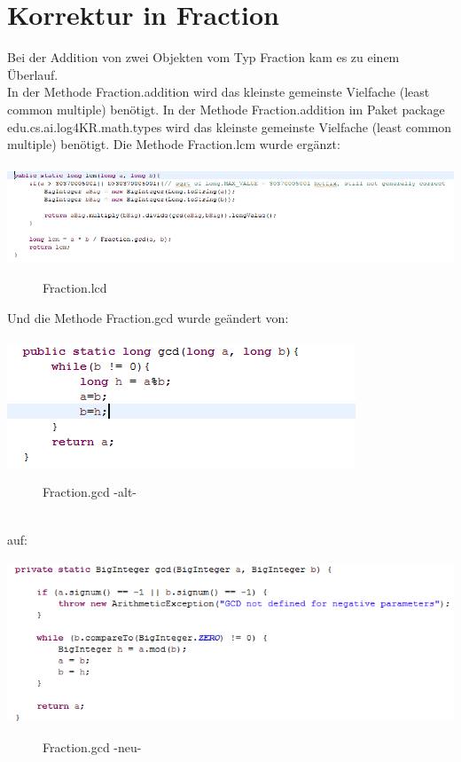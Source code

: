 \documentclass[a4paper, 11pt]{book}
\begin{document}
{\section{Korrektur in Fraction}
Bei der Addition von zwei Objekten vom Typ Fraction kam es zu einem Überlauf.\\
In der Methode Fraction.addition wird das kleinste gemeinste Vielfache (least common multiple) benötigt. 
In der Methode Fraction.addition im Paket package edu.cs.ai.log4KR.math.types wird das kleinste gemeinste Vielfache (least common multiple) benötigt. 
Die Methode Fraction.lcm wurde ergänzt:\\
\\
\includegraphics[scale = 1.0]{Graphics/Aenderung_221}
\begin{figure}[h]
	\caption{Fraction.lcd}
\end{figure}

Und die Methode Fraction.gcd wurde geändert von:\\
\\
\includegraphics[scale = 1.0]{Graphics/Aenderung_211}
\begin{figure}[h]
	\caption{Fraction.gcd -alt-}
\end{figure}
\\
auf:\\
\\
\includegraphics[scale = 1.0]{Graphics/Aenderung_212}
\begin{figure}[h]
	\caption{Fraction.gcd -neu-}
\end{figure}

}
\end{document}
